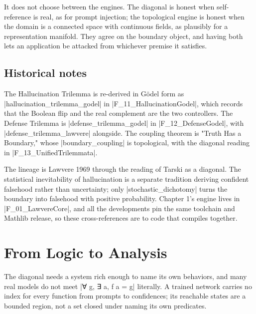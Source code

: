 \documentclass{memoir}
\begin{document}
It does not choose between the engines. The diagonal is honest when
self-reference is real, as for prompt injection; the topological engine is
honest when the domain is a connected space with continuous fields, as plausibly
for a representation manifold. They agree on the boundary object, and having
both lets an application be attacked from whichever premise it satisfies.



\section{Historical notes}\label{Two--Schemas--of--Impossibility-005F-005F-005F--Machine--Checked--Limits--of--Trustworthy--Machine--Learning-005F-005F-005F--and--Why--They--Tighten--with--Capability----Three--Trilemmata-005F-005F-005F--One--Theorem----Historical--notes}

The Hallucination Trilemma is re-derived in Gödel form as
\LeanVerb|hallucination_trilemma_godel| in \LeanVerb|F_11_HallucinationGodel|, which records that
the Boolean flip and the real complement are the two controllers. The Defense
Trilemma is \LeanVerb|defense_trilemma_godel| in \LeanVerb|F_12_DefenseGodel|, with
\LeanVerb|defense_trilemma_lawvere| alongside. The coupling theorem is "Truth Has a
Boundary," whose \LeanVerb|boundary_coupling| is topological, with the diagonal reading
in \LeanVerb|F_13_UnifiedTrilemmata|.

The lineage is Lawvere 1969 through the reading of Tarski as a diagonal. The
statistical inevitability of hallucination is a separate tradition deriving
confident falsehood rather than uncertainty; only \LeanVerb|stochastic_dichotomy| turns
the boundary into falsehood with positive probability. Chapter 1's engine lives
in \LeanVerb|F_01_LawvereCore|, and all the developments pin the same toolchain and
Mathlib release, so these cross-references are to code that compiles together.





\chapter{From Logic to Analysis}\label{Two--Schemas--of--Impossibility-005F-005F-005F--Machine--Checked--Limits--of--Trustworthy--Machine--Learning-005F-005F-005F--and--Why--They--Tighten--with--Capability----From--Logic--to--Analysis}

The diagonal needs a system rich enough to name its own behaviors, and many real
models do not meet \LeanVerb|∀ g, ∃ a, f a = g| literally. A trained network carries no
index for every function from prompts to confidences; its reachable states are a
bounded region, not a set closed under naming its own predicates.
\end{document}
